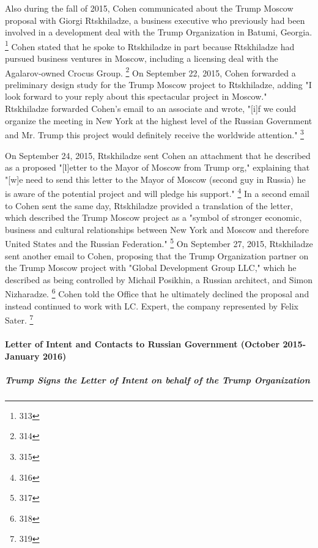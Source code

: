 Also during the fall of 2015, Cohen communicated about the Trump Moscow proposal with Giorgi Rtskhiladze, a business executive who previously had been involved in a development deal with the Trump Organization in Batumi, Georgia.%
\footnote{313}
Cohen stated that he spoke to Rtskhiladze in part because Rtskhiladze had pursued business ventures in Moscow, including a licensing deal with the Agalarov-owned Crocus Group.%
\footnote{314}
On September 22, 2015, Cohen forwarded a preliminary design study for the Trump Moscow project to Rtskhiladze, adding "I look forward to your reply about this spectacular project in Moscow."
Rtskhiladze forwarded Cohen's email to an associate and wrote, "[i]f we could organize the meeting in New York at the highest level of the Russian Government and Mr. Trump this project would definitely receive the worldwide attention."%
\footnote{315}

On September 24, 2015, Rtskhiladze sent Cohen an attachment that he described as a proposed "[l]etter to the Mayor of Moscow from Trump org," explaining that "[w]e need to send this letter to the Mayor of Moscow (second guy in Russia) he is aware of the potential project and will pledge his support."%
\footnote{316}
In a second email to Cohen sent the same day, Rtskhiladze provided a translation of the letter, which described the Trump Moscow project as a "symbol of stronger economic, business and cultural relationships between New York and Moscow and therefore United States and the Russian Federation."%
\footnote{317}
On September 27, 2015, Rtskhiladze sent another email to Cohen, proposing that the Trump Organization partner on the Trump Moscow project with "Global Development Group LLC," which he described as being controlled by Michail Posikhin, a Russian architect, and Simon Nizharadze.%
\footnote{318}
Cohen told the Office that he ultimately declined the proposal and instead continued to work with LC. Expert, the company represented by Felix Sater.%
\footnote{319}

\paragraph{Letter of Intent and Contacts to Russian Government (October 2015-January 2016)}

\subparagraph{Trump Signs the Letter of Intent on behalf of the Trump Organization}

